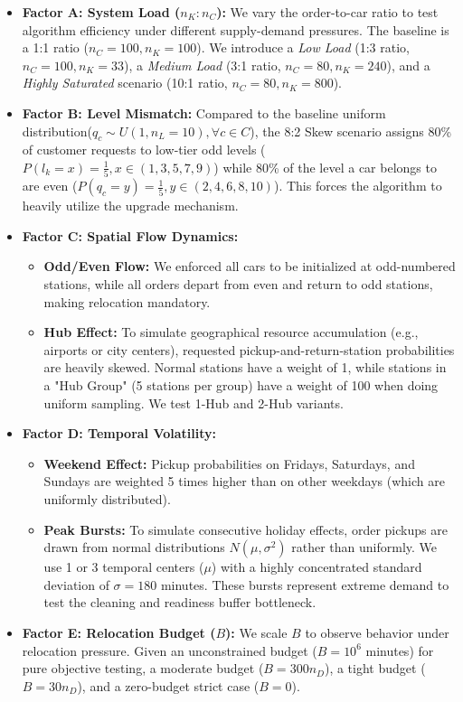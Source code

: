 \documentclass[10pt,a4paper]{article}
\begin{document}
\begin{itemize}[itemsep=2pt, parsep=0pt, topsep=4pt]
    \item \textbf{Factor A: System Load ($n_K:n_C$):} We vary the order-to-car ratio to test algorithm efficiency under different supply-demand pressures. The baseline is a 1:1 ratio ($n_C=100, n_K=100$). We introduce a \textit{Low Load} (1:3 ratio, $n_C=100, n_K=33$), a \textit{Medium Load} (3:1 ratio, $n_C=80, n_K=240$), and a \textit{Highly Saturated} scenario (10:1 ratio, $n_C=80, n_K=800$).    
    \item \textbf{Factor B: Level Mismatch:} Compared to the baseline uniform distribution($q_c\sim U(1, n_L=10), \forall c\in C$), the 8:2 Skew scenario assigns 80\% of customer requests to low-tier odd levels ($P(l_k=x)=\frac{1}{5}, x\in (1, 3, 5, 7, 9)$) while 80\% of the level a car belongs to are even ($P(q_c=y)=\frac{1}{5}, y\in (2, 4, 6, 8, 10)$). This forces the algorithm to heavily utilize the upgrade mechanism.
    
    \item \textbf{Factor C: Spatial Flow Dynamics:} 
    \begin{itemize}[itemsep=2pt, parsep=0pt, topsep=2pt]
        \item \textbf{Odd/Even Flow:} We enforced all cars to be  initialized at odd-numbered stations, while all orders depart from even and return to odd stations, making relocation mandatory.
        \item \textbf{Hub Effect:} To simulate geographical resource accumulation (e.g., airports or city centers), requested pickup-and-return-station probabilities are heavily skewed. Normal stations have a weight of 1, while stations in a "Hub Group" (5 stations per group) have a weight of 100 when doing uniform sampling. We test 1-Hub and 2-Hub variants.
    \end{itemize}
    
    \item \textbf{Factor D: Temporal Volatility:} 
    \begin{itemize}[itemsep=2pt, parsep=0pt, topsep=2pt]
        \item \textbf{Weekend Effect:} Pickup probabilities on Fridays, Saturdays, and Sundays are weighted 5 times higher than on other weekdays (which are uniformly distributed).
        \item \textbf{Peak Bursts:} To simulate consecutive holiday effects, order pickups are drawn from normal distributions $N(\mu, \sigma^2)$ rather than uniformly. We use 1 or 3 temporal centers ($\mu$) with a highly concentrated standard deviation of $\sigma = 180$ minutes. These bursts represent extreme demand to test the cleaning and readiness buffer bottleneck.
    \end{itemize}
    
    \item \textbf{Factor E: Relocation Budget ($B$):} We scale $B$ to observe behavior under relocation pressure. Given an unconstrained budget ($B=10^6$ minutes) for pure objective testing, a moderate budget ($B=300 n_D$), a tight budget ($B=30 n_D$), and a zero-budget strict case ($B=0$).
\end{itemize}
\end{document}
